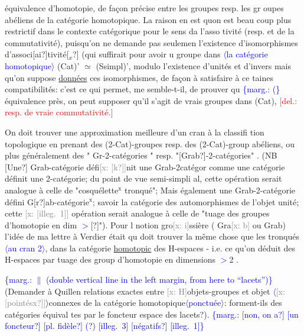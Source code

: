 \documentclass[11pt]{article}
\newcommand{\scanpage}[1]{\par\bigskip\noindent{\small\sffamily[scan #1]}\par}
\newcommand{\mspage}[1]{{\small\sffamily[p.\,#1]}}
\newcommand{\hand}[1]{\textcolor{blue}{#1}}
\let\over\relax
\newcommand{\over}[2]{\textcolor{gray}{#1}\textcolor{blue}{\ensuremath{^{\!\nearrow}}#2}}
\newcommand{\inserted}[2][]{\textcolor{blue}{$\langle$#2$\rangle$}}
\newcommand{\margin}[1]{\textcolor{blue}{\{\textsf{marg.:} #1\}}}
\newcommand{\deleted}[1]{\textcolor{red}{[\textsf{del.:} #1]}}
\newcommand{\xout}[1]{\textcolor{gray}{[\textsf{x:} #1]}}
\newcommand{\uline}[1]{\underline{#1}}
\newcommand{\unsure}[1]{[#1?]}
\newcommand{\illegible}[1]{[\textsf{illeg.\ #1}]}
\begin{document}
équivalence d'homotopie, de façon précise entre les groupes resp. les gr
oupes abéliens de la catégorie homotopique. La raison en est quon est beau
coup plus restrictif dans le contexte catégorique pour le sens da l'asso
tivité (resp. et de la commutativité), puisqu'on ne demande pas seulemen
l'existence d'isomorphismes d'associ\unsure{ai}tivité\unsure{$_x$} (qui suffirait pour avoir u
groupe dans \inserted[typed]{la catégorie homotopique} (Cat)' $\simeq$ (Ssimpl)', modulo l'existence d'unités et d'invers
mais qu'on suppose \uline{données} ces isomorphismes, de façon à satisfaire à ce
taines compatibilités: c'est ce qui permet, me semble-t-il, de prouver qu
\margin{(}équivalence près, on peut supposer qu'il s'agit de vrais groupes dans
(Cat), \deleted{resp. de vraie commutativité.}

\mspage{8}

\clearpage
\scanpage{162-5/9}
\mspage{\hand{8}}

On doit trouver une approximation meilleure d'un cran à la classifi
tion topologique en prenant des  (2-Cat)-groupes resp. des (2-Cat)-group
abéliens,  ou plus généralement des " Gr-2-catégories "  resp.
"\unsure{Grab}-2-catégories" . (NB  \unsure{Une} Grab-catégorie défi\xout{\unsure{k}}nit une Grab-2catégor
comme une catégorie définit une 2-catégorie; du point de vue semi-simpli
al, cette opération serait analogue à celle de "cosquélette$^{\text{x}}$ tronqué";
Mais également une Grab-2-catégorie défini\over{e}{t} \over{en}{une} G\unsure{r}ab-catégorie$^{\text{x}}$; savoir la
catégorie des automorphismes de l'objet unité; cette \xout{\illegible{1}} opération serait
analogue à celle de "tuage des groupes d'homotopie en dim \hand{$>$}\unsure{\over{2}{1}}"). Pour l
notion gro\xout{i}ssière ( Gra\xout{b} ou Grab) l'idée de ma lettre à Verdier était qu
doit trouver la même chose que les tronqués \inserted{au cran 2}, dans la catégorie \uline{homotopic}
des H-espaces  -  i.e. ce qu'on déduit des H-espaces par tuage des group
d'homotopie en dimensions \hand{$>$}2 .

\margin{\hand{$\|$} (double vertical line in the left margin, from here to ``lacets'')}(Demander à Quillen relations exactes entre \xout{H}objets-groupes et objet
\inserted[typed]{\xout{\unsure{pointésx}}}connexes de la catégorie homotopique\inserted{ponctuée}: forment-ils des catégories équival
tes par le foncteur espace des lacets\hand{?}).
\margin{\unsure{non, on a} \unsure{un foncteur} \unsure{pl. fidèle} (?) \illegible{3} \unsure{négatifs} \illegible{1}}
\end{document}
